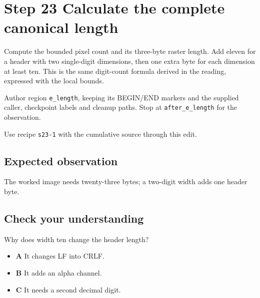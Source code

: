 \section{Step 23 Calculate the complete canonical length}\label{ppm-s23}

Compute the bounded pixel count and its three-byte raster length. Add eleven for a header with two single-digit dimensions, then one extra byte for each dimension at least ten. This is the same digit-count formula derived in the reading, expressed with the local bounds.

Author region \texttt{e\_length}, keeping its BEGIN/END markers and the supplied caller, checkpoint labels and cleanup paths. Stop at \texttt{after\_e\_length} for the observation.

Use recipe \texttt{s23-1} with the cumulative source through this edit.

\subsection{Expected observation}
The worked image needs twenty-three bytes; a two-digit width adds one header byte.

\subsection{Check your understanding}
Why does width ten change the header length?

\begin{itemize}
  \item \textbf{A} It changes LF into CRLF.
  \item \textbf{B} It adds an alpha channel.
  \item \textbf{C} It needs a second decimal digit.
\end{itemize}
